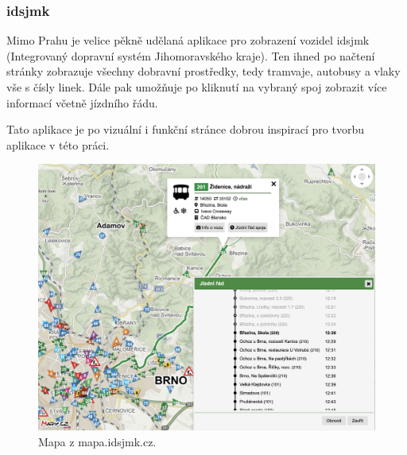 \subsubsection{\gls{idsjmk}}

Mimo Prahu je velice pěkně udělaná aplikace pro zobrazení vozidel \gls{idsjmk} (Integrovaný dopravní systém Jihomoravského kraje). Ten ihned po načtení stránky zobrazuje všechny dobravní prostředky, tedy tramvaje, autobusy a vlaky vše s čísly linek. Dále pak umožňuje po kliknutí na vybraný spoj zobrazit více informací včetně jízdního řádu.

\bigbreak

Tato aplikace je po vizuální i funkční stránce dobrou inspirací pro tvorbu aplikace v této práci.

\begin{figure}
  \includegraphics[width=\linewidth]{../img/idsjmk_mapa.png}
  \caption{Mapa z mapa.idsjmk.cz.}
  \label{fig:idsjmk_result}
\end{figure}
